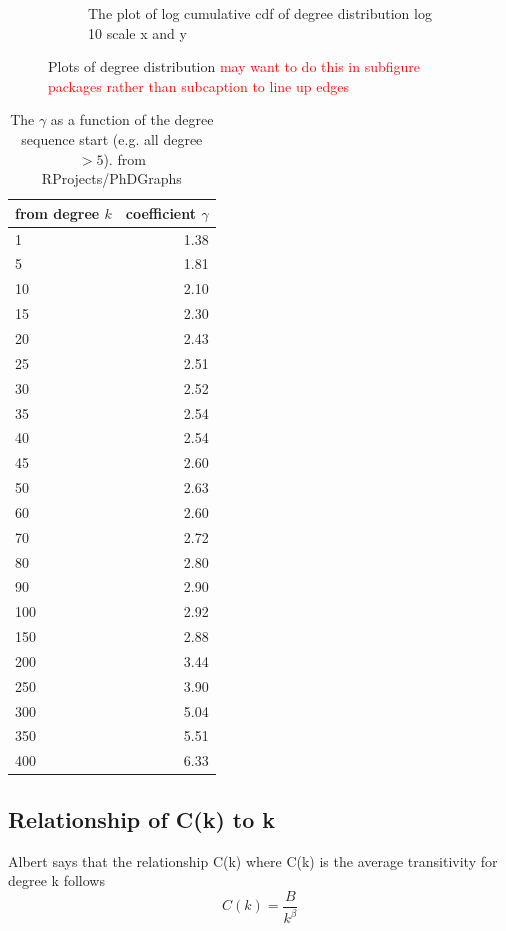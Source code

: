 \begin{figure}
\begin{subfigure}[t]{0.45\textwidth}
        \caption{The plot of log cumulative cdf of degree distribution log 10 scale x and y} \label{fig:log_degree_distribution}
    \end{subfigure}
    \caption{Plots of degree distribution \textcolor{red}{may want to do this in subfigure packages rather than subcaption to line up edges}}
\end{figure}

\begin{table}[ht]
\centering
\begin{tabular}{lr}
  \hline
  from degree $k$ & coefficient $\gamma$ \\ 
  \hline
1 & 1.38 \\ 
  5 & 1.81 \\ 
  10 & 2.10 \\ 
  15 & 2.30 \\ 
  20 & 2.43 \\ 
  25 & 2.51 \\ 
   30 & 2.52 \\ 
  35 & 2.54 \\ 
   40 & 2.54 \\ 
   45 & 2.60 \\ 
  50 & 2.63 \\ 
   60 & 2.60 \\ 
   70 & 2.72 \\ 
   80 & 2.80 \\ 
   90 & 2.90 \\ 
   100 & 2.92 \\ 
  150 & 2.88 \\ 
   200 & 3.44 \\ 
   250 & 3.90 \\ 
  300 & 5.04 \\ 
   350 & 5.51 \\ 
   400 & 6.33 \\ 
   \hline
\end{tabular}
\caption{The $\gamma$ as a function of the degree sequence start (e.g. all degree $>5$). from RProjects/PhDGraphs}
  \label{table:gamma}
\end{table}

\subsection{Relationship of C(k) to k}
Albert \cite{albert2005scale} says that the relationship C(k) where C(k) is the average transitivity for degree k follows
\begin{equation}
            C(k) = \frac{B}{k^{\beta}}
\end{equation}
\label{eq:C(k) function average transitivity and degree}

